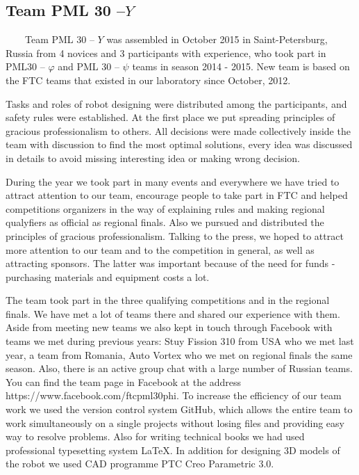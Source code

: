 
\subsection{Team PML 30 --${Y}$} 
	
	
        Team PML 30 -- ${Y}$ was assembled in October 2015 in Saint-Petersburg, Russia from 4 novices and 3 participants with experience, who took part in PML30 -- ${\varphi}$ and PML 30 -- ${\psi}$ teams in season 2014 - 2015. New team is based on the FTC teams that existed in our laboratory since October, 2012. 
	
	Tasks and roles of robot designing were distributed among the participants, and safety rules were established. At the first place we put spreading principles of gracious professionalism to others. All decisions were made collectively inside the team with discussion to find the most optimal solutions, every idea was discussed in details to avoid missing interesting idea or making wrong decision. 
	
	During the year we took part in many events and everywhere we have tried to attract attention to our team, encourage people to take part in FTC and helped competitions organizers in the way of explaining rules and making regional qualyfiers as official as regional finals. Also we pursued and distributed the principles of gracious professionalism. Talking to the press, we hoped to attract more attention to our team and to the competition in general, as well as attracting sponsors. The latter was important because of the need for funds - purchasing materials and equipment costs a lot.
	
	The team took part in the three qualifying competitions and in the regional finals. We have met a lot of teams there and shared our experience with them. Aside from meeting new teams we also kept in touch through Facebook with teams we met during previous years: Stuy Fission 310 from USA who we met last year, a team from Romania, Auto Vortex who we met on regional finals the same season. Also, there is an active group chat with a large number of Russian teams. You can find the team page in Facebook at the address https://www.facebook.com/ftcpml30phi.
	To increase the efficiency of our team work we used the version control system GitHub, which allows the entire team to work simultaneously on a single projects without losing files and providing easy way to resolve problems. Also for writing technical books we had used professional typesetting system LaTeX.
	In addition for designing 3D models of the robot we used CAD programme PTC Creo Parametric 3.0.
	
